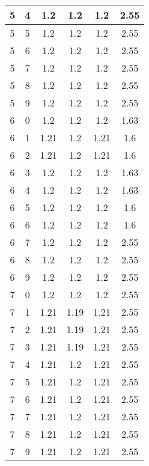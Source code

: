 \begin{longtable}{|c|c||c||c||c|c|}
	5 & 4 & 1.2 & 1.2 & 1.2 & 2.55 \\ \hline
	5 & 5 & 1.2 & 1.2 & 1.2 & 2.55 \\ \hline
	5 & 6 & 1.2 & 1.2 & 1.2 & 2.55 \\ \hline
	5 & 7 & 1.2 & 1.2 & 1.2 & 2.55 \\ \hline
	5 & 8 & 1.2 & 1.2 & 1.2 & 2.55 \\ \hline
	5 & 9 & 1.2 & 1.2 & 1.2 & 2.55 \\ \hline
	6 & 0 & 1.2 & 1.2 & 1.2 & 1.63 \\ \hline
	6 & 1 & 1.21 & 1.2 & 1.21 & 1.6 \\ \hline
	6 & 2 & 1.21 & 1.2 & 1.21 & 1.6 \\ \hline
	6 & 3 & 1.2 & 1.2 & 1.2 & 1.63 \\ \hline
	6 & 4 & 1.2 & 1.2 & 1.2 & 1.63 \\ \hline
	6 & 5 & 1.2 & 1.2 & 1.2 & 1.6 \\ \hline
	6 & 6 & 1.2 & 1.2 & 1.2 & 1.6 \\ \hline
	6 & 7 & 1.2 & 1.2 & 1.2 & 2.55 \\ \hline
	6 & 8 & 1.2 & 1.2 & 1.2 & 2.55 \\ \hline
	6 & 9 & 1.2 & 1.2 & 1.2 & 2.55 \\ \hline
	7 & 0 & 1.2 & 1.2 & 1.2 & 2.55 \\ \hline
	7 & 1 & 1.21 & 1.19 & 1.21 & 2.55 \\ \hline
	7 & 2 & 1.21 & 1.19 & 1.21 & 2.55 \\ \hline
	7 & 3 & 1.21 & 1.19 & 1.21 & 2.55 \\ \hline
	7 & 4 & 1.21 & 1.2 & 1.21 & 2.55 \\ \hline
	7 & 5 & 1.21 & 1.2 & 1.21 & 2.55 \\ \hline
	7 & 6 & 1.21 & 1.2 & 1.21 & 2.55 \\ \hline
	7 & 7 & 1.21 & 1.2 & 1.21 & 2.55 \\ \hline
	7 & 8 & 1.21 & 1.2 & 1.21 & 2.55 \\ \hline
	7 & 9 & 1.21 & 1.2 & 1.21 & 2.55 \\ \hline
\end{longtable}

